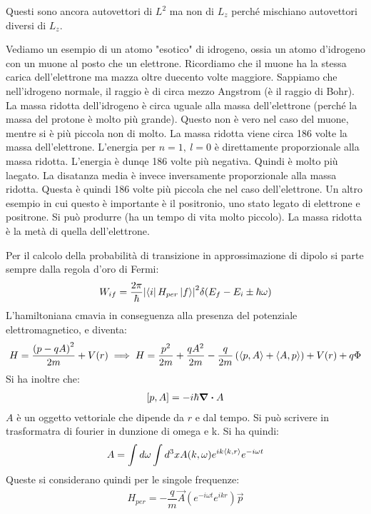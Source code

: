 \documentclass[../AppuntiStruttura.tex]{subfiles}
\begin{document}
	Questi sono ancora autovettori di $ L^2 $ ma non di $ L_z $ perché mischiano autovettori diversi di $ L_{z} $.
	\begin{exe}
		Vediamo un esempio di un atomo "esotico" di idrogeno, ossia un atomo d'idrogeno con un muone al posto che un elettrone. Ricordiamo che il muone ha la stessa carica dell'elettrone ma mazza oltre duecento volte maggiore. Sappiamo che nell'idrogeno normale, il raggio è di circa mezzo Angstrom (è il raggio di Bohr). La massa ridotta dell'idrogeno è circa uguale alla massa dell'elettrone (perché la massa del protone è molto più grande). Questo non è vero nel caso del muone, mentre si è più piccola non di molto. La massa ridotta viene circa 186 volte la massa dell'elettrone. L'energia per $ n=1,\ l=0 $ è direttamente proporzionale alla massa ridotta. L'energia è dunqe 186 volte più negativa. Quindi è molto più laegato. La disatanza media è invece inversamente proporzionale alla massa ridotta. Questa è quindi 186 volte più piccola che nel caso dell'elettrone. Un altro esempio in cui questo è importante è il positronio, uno stato legato di elettrone e positrone. Si può produrre (ha un tempo di vita molto piccolo). La massa ridotta è la metà di quella dell'elettrone.
		\end{exe}
		Per il calcolo della probabilità di transizione in approssimazione di dipolo si parte sempre dalla regola d'oro di Fermi:
		\begin{gather*}
		W_{if}=\dfrac{2\pi}{\hbar}\abs{\bra{i}{H_{per}}\ket{f}}^2\delta(E_f-E_{i}\pm\hbar\omega)
		\end{gather*}
		L'hamiltoniana cmavia in conseguenza alla presenza del potenziale elettromagnetico, e diventa:
		\begin{gather*}
		H=\dfrac{\left(p-qA\right)^2}{2m}+V(r)\implies H=\dfrac{p^{2}}{2m}+\dfrac{qA^2}{2m}-\dfrac{q}{2m}\left(\left<p,A\right>+\left<A,p\right>\right)+V(r)+q\Phi
		\end{gather*}
		Si ha inoltre che:
		\begin{gather*}
		\comm{p}{A}=-i\hbar\div A
		\end{gather*}
		$A $ è un oggetto vettoriale che dipende da $ r $ e dal tempo. Si può scrivere in trasformatra di fourier in dunzione di omega e k. Si  ha quindi:
		\begin{gather*}
		A=\int d\omega \int d^3xA(k,\omega)e^{ik\left<k,r\right>}e^{-i\omega t}
		\end{gather*}
		Queste si considerano quindi per le singole frequenze:
		\begin{gather*}
		H_{per}=-\dfrac{q}{m}\vec{A}(e^{-i\omega t}e^{ikr})\vec{p}
		\end{gather*}
\end{document}
